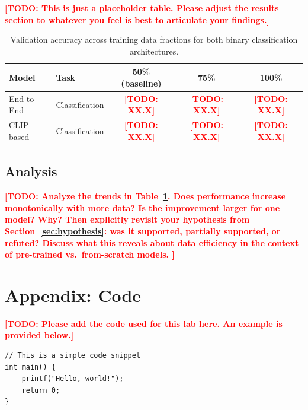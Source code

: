 \documentclass[11pt]{article}
\newcommand{\todo}[1]{\textcolor{red}{\textbf{[TODO: #1]}}}
\begin{document}
\todo{This is just a placeholder table. Please adjust the results section to whatever you feel is best to articulate your findings.}

\begin{table}[h]
  \centering
  \caption{Validation accuracy across training data fractions for both binary
           classification architectures.}
  \label{tab:data_eff}
  \begin{tabular}{llccc}
    \toprule
    \textbf{Model} & \textbf{Task} & \textbf{50\% (baseline)} & \textbf{75\%} & \textbf{100\%} \\
    \midrule
    End-to-End  & Classification & \todo{XX.X} & \todo{XX.X} & \todo{XX.X} \\
    CLIP-based  & Classification & \todo{XX.X} & \todo{XX.X} & \todo{XX.X} \\
    \bottomrule
  \end{tabular}
\end{table}

\subsection{Analysis}

\todo{
  Analyze the trends in Table~\ref{tab:data_eff}. Does performance
  increase monotonically with more data? Is the improvement larger for
  one model? Why? Then explicitly revisit your hypothesis from
  Section~\ref{sec:hypothesis}: was it supported, partially supported,
  or refuted? Discuss what this reveals about data efficiency in the
  context of pre-trained vs.\ from-scratch models.
}

\label{sec:hypothesis}


\clearpage
\appendix
\section*{Appendix: Code}
\todo{Please add the code used for this lab here. An example is provided below.}

\begin{verbatim}
// This is a simple code snippet
int main() {
    printf("Hello, world!");
    return 0;
}
\end{verbatim}
\end{document}
